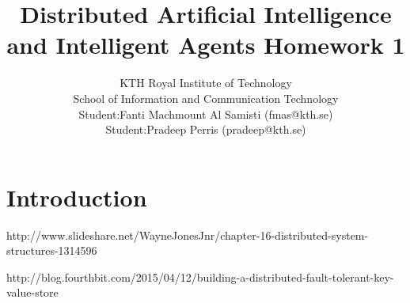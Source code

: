 \documentclass[a4paper, 11pt]{article}
\title{\textbf{Distributed Artificial Intelligence and Intelligent Agents Homework 1}}
\author{KTH Royal Institute of Technology \\ 
		School of Information and Communication Technology \\
		Student:Fanti Machmount Al Samisti (fmas@kth.se) \\
		Student:Pradeep Perris (pradeep@kth.se)}
\begin{document}
	
\maketitle

\section{Introduction}

http://www.slideshare.net/WayneJonesJnr/chapter-16-distributed-system-structures-1314596

http://blog.fourthbit.com/2015/04/12/building-a-distributed-fault-tolerant-key-value-store
\end{document}
